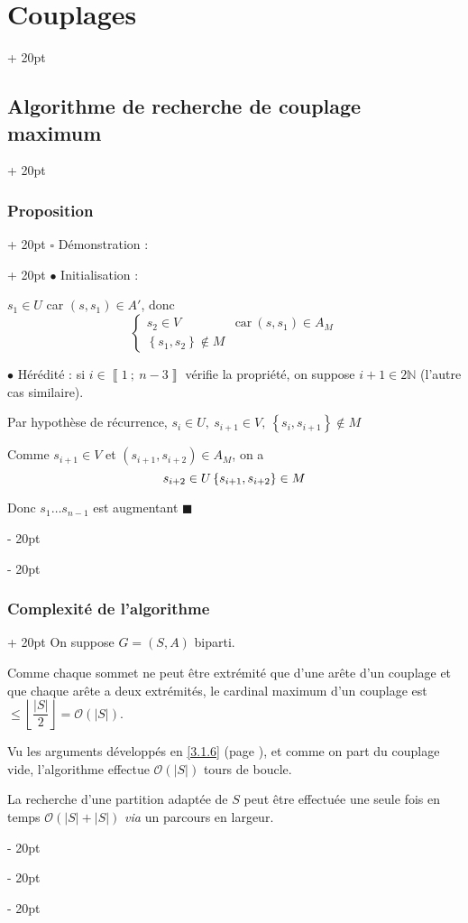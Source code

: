 \documentclass[a4paper, 12pt, twoside]{article}
\newcommand{\N}{\mathbb{N}} %
\newcommand{\nset}[2]{\left\llbracket #1\ ;\ #2 \right\rrbracket}
\newcommand{\set}[1]{\left\{ #1 \right\}}
\newcommand{\abs}[1]{\left\lvert #1 \right\rvert}
\newcommand{\floor}[1]{\left\lfloor #1 \right\rfloor}
\renewcommand{\le}{\leqslant}
\newcommand{\ind}[1][20pt]{\advance\leftskip + #1}
\newcommand{\deind}[1][20pt]{\advance\leftskip - #1}
\newenvironment{indt}[2][20pt]{#2 \par \ind[#1]}{\par \deind} %
\newenvironment{proof}[1][{Démonstration :}]{\begin{indt}{$\square$ #1}}{$\blacksquare$ \end{indt}}
\begin{document}
\begin{indt}{\section{Couplages}}
\begin{indt}{\subsection{Algorithme de recherche de couplage maximum}}
\begin{indt}{\subsubsection{Proposition}}
\begin{proof}
                    $\bullet$ Initialisation :

                    $s_1 \in U$ car $(s, s_1) \in A'$, donc
                    \[
                        \begin{cases}
                            s_2 \in V & \text{car}\ (s, s_1) \in A_M
                            \\
                            \set{s_1, s_2} \notin M
                        \end{cases}
                    \]

                    \vspace{6pt}
                    
                    $\bullet$ Hérédité : si $i \in \nset 1 {n - 3}$ vérifie la propriété, on suppose $i + 1 \in 2\N$ (l'autre cas similaire).

                    Par hypothèse de récurrence, $s_i \in U,\ s_{i + 1} \in V,\ \set{s_i, s_{i + 1}} \notin M$

                    Comme $s_{i + 1} \in V$ et $(s_{i + 1}, s_{i + 2}) \in A_M$, on a
                    \[
                        s_{i + 2} \in U
                        \\
                        \set{s_{i + 1}, s_{i + 2}} \in M
                    \]

                    Donc $s_1 \ldots s_{n - 1}$ est augmentant
                \end{proof}
            \end{indt}

            \vspace{12pt}
            
            \begin{indt}{\subsubsection{Complexité de l'algorithme}}
                On suppose $G = (S, A)$ biparti.

                Comme chaque sommet ne peut être extrémité que d'une arête d'un couplage et que chaque arête a deux extrémités, le cardinal maximum d'un couplage est $\le \floor{\dfrac{\abs S}{2}} = \mathcal O(\abs S)$.

                Vu les arguments développés en \ref{3.1.6} (page \pageref{3.1.6}), et comme on part du couplage vide, l'algorithme effectue $\mathcal O(\abs S)$ tours de boucle.

                La recherche d'une partition adaptée de $S$ peut être effectuée une seule fois en temps $\mathcal O(\abs S + \abs S)$ \textit{via} un parcours en largeur.


\end{indt}
\end{indt}
\end{indt}
\end{document}
